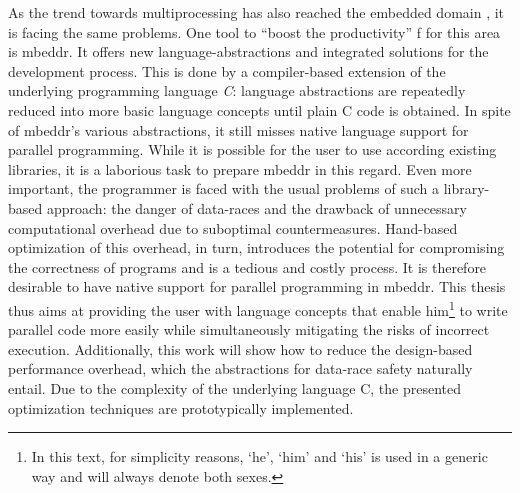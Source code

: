 As the trend towards multiprocessing has also reached the embedded domain \cite{MulticoreChallenges}\cite{LeveragingTheBenefits}, it is facing the same problems. One tool to ``boost the productivity'' \cite{mbeddr}f for this area is mbeddr. It offers new language-abstractions and integrated solutions for the development process. This is done by a compiler-based extension of the underlying programming language \textit{C}: language abstractions are repeatedly reduced into more basic language concepts until plain C code is obtained. In spite of mbeddr's various abstractions, it still misses native language support for parallel programming. While it is possible for the user to use according existing libraries, it is a laborious task to prepare mbeddr in this regard. Even more important, the programmer is faced with the usual problems of such a library-based approach: the danger of data-races and the drawback of unnecessary computational overhead due to suboptimal countermeasures. Hand-based optimization of this overhead, in turn, introduces the potential for compromising the correctness of programs and is a tedious and costly process. It is therefore desirable to have native support for parallel programming in mbeddr. This thesis thus aims at providing the user with language concepts that enable him\footnote{In this text, for simplicity reasons, `he', `him' and `his' is used in a generic way and will always denote both sexes.} to write parallel code more easily while simultaneously mitigating the risks of incorrect execution. Additionally, this work will show how to reduce the design-based performance overhead, which the abstractions for data-race safety naturally entail. Due to the complexity of the underlying language C, the presented optimization techniques are prototypically implemented. 

